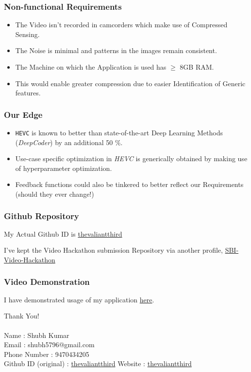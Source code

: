 \documentclass{beamer}
\begin{document}
\begin{frame}
    \frametitle{Non-functional Requirements}

    \begin{itemize}
        \item The Video isn't recorded in camcorders which make use of Compressed Sensing.
        \item The Noise is minimal and patterns in the images remain consistent.
        \item The Machine on which the Application is used has $\geq$ 8GB RAM.
        \item This would enable greater compression due to easier Identification of Generic features.
    \end{itemize}
\end{frame}


\begin{frame}
    \frametitle{Our Edge}
    \begin{itemize}
        \item \texttt{HEVC} is known to better than state-of-the-art Deep Learning Methods (\textit{DeepCoder}) by an additional 50 $\%$.
        \item Use-case specific optimization in \textit{HEVC} is generically obtained by making use of hyperparameter optimization.
        \item Feedback functions could also be tinkered to better reflect our Requirements (should they ever change!)
    \end{itemize}
\end{frame}

\begin{frame}
    \frametitle{Github Repository}

    My Actual Github ID is \href{https://github.com/thevaliantthird}{thevaliantthird}

    I've kept the Video Hackathon submission Repository via another profile, \href{https://github.com/theintrepidthird/SBI-Video-Hackathon}{SBI-Video-Hackathon}
\end{frame}

\begin{frame}
    \frametitle{Video Demonstration}

    I have demonstrated usage of my application \href{https://github.com/theintrepidthird/SBI-Video-Hackathon/blob/main/demonstration.mp4}{here}.
\end{frame}

\begin{frame}
    \begin{center}
        Thank You! \\~\\
        Name : Shubh Kumar  \\
        Email : shubh5796@gmail.com \\
        Phone Number : 9470434205 \\
        Github ID (original) : \href{https://github.com/thevaliantthird}{thevaliantthird}
        Website : \href{thevaliantthird.github.io}{thevaliantthird}
        
    \end{center}

\end{frame}
\end{document}
